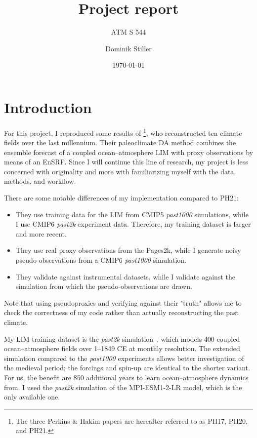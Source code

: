 \documentclass[parskip=half,DIV=16]{scrartcl}
\title{Project report}
\subtitle{ATM S 544}
\author{Dominik Stiller}
\date{\today}
\begin{document}
\maketitle


\section{Introduction}

For this project, I reproduced some results of \textcite{Perkins2021}\footnote{The three Perkins \& Hakim papers are hereafter referred to as PH17, PH20, and PH21.}, who reconstructed ten climate fields over the last millennium. Their paleoclimate \gls{DA} method combines the ensemble forecast of a coupled ocean--atmosphere \gls{LIM} with proxy observations by means of an \gls{EnSRF}. Since I will continue this line of research, my project is less concerned with originality and more with familiarizing myself with the data, methods, and workflow.

There are some notable differences of my implementation compared to PH21:
\begin{itemize}
    \item They use training data for the \gls{LIM} from CMIP5 \emph{past1000} simulations, while I use CMIP6 \emph{past2k} experiment data. Therefore, my training dataset is larger and more recent.
    \item They use real proxy observations from the Pages2k, while I generate noisy pseudo-observations from a CMIP6 \emph{past1000} simulation.
    \item They validate against instrumental datasets, while I validate against the simulation from which the pseudo-observations are drawn.
\end{itemize}
Note that using pseudoproxies and verifying against their "truth" allows me to check the correctness of my code rather than actually reconstructing the past climate.

My \gls{LIM} training dataset is the \emph{past2k} simulation~\parencite{Jungclaus2017}, which models 400 coupled ocean--atmosphere fields over 1--1849 CE at monthly resolution. The extended simulation compared to the \emph{past1000} experiments allows better investigation of the medieval period; the forcings and spin-up are identical to the shorter variant. For us, the benefit are 850 additional years to learn ocean--atmosphere dynamics from. I used the \emph{past2k} simulation of the MPI-ESM1-2-LR model, which is the only available one.
\end{document}

